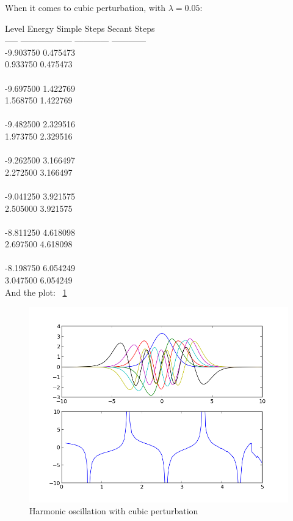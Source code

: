 \documentclass[11pt,letterpaper]{article}
\begin{document}
When it comes to cubic perturbation, with $\lambda=0.05$:

 Level       Energy           Simple Steps   Secant Steps\\
 -----   ------------------   ------------   ------------\\
   -9.903750     0.475473\\
    0.933750     0.475473\\
\\
   -9.697500     1.422769\\
    1.568750     1.422769\\
\\
   -9.482500     2.329516\\
    1.973750     2.329516\\
\\
   -9.262500     3.166497\\
    2.272500     3.166497\\
\\
   -9.041250     3.921575\\
    2.505000     3.921575\\
\\
   -8.811250     4.618098\\
    2.697500     4.618098\\
\\
   -8.198750     6.054249\\
    3.047500     6.054249\\

And the plot: ~\ref{figure5}

\begin{figure}
\begin{center}
\includegraphics[width=0.8\linewidth,angle=0]{p2x3.png}
\caption{Harmonic oscillation with cubic perturbation}
\label{figure5}
\end{center}
\end{figure}
\end{document}
